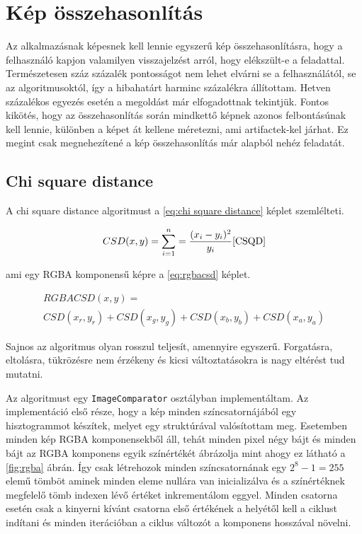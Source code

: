 \section{Kép összehasonlítás}

Az alkalmazásnak képesnek kell lennie egyszerű kép összehasonlításra, hogy a felhasználó kapjon valamilyen visszajelzést arról, hogy elékszült-e a feladattal. Természetesen száz százalék pontosságot nem lehet elvárni se a felhasználától, se az algoritmusoktól, így a hibahatárt harminc százalékra állítottam. Hetven százalékos egyezés esetén a megoldást már elfogadottnak tekintjük. Fontos kikötés, hogy az összehasonlítás során mindkettő képnek azonos felbontásúnak kell lennie, különben a képet át kellene méretezni, ami artifactek-kel járhat. Ez megint csak megnehezítené a kép összehasonlítás már alapból nehéz feladatát.

\subsection{Chi square distance}

A chi square distance algoritmust a \ref{eq:chi square distance} képlet szemlélteti.

\begin{equation} \label{eq:chi square distance}
    CSD(x,y) = \sum_{i=1}^{n} = \frac{(x_i - y_i)^2}{y_i}\cite{CSQD}
\end{equation}

ami egy RGBA komponensű képre a \ref{eq:rgbacsd} képlet.

\begin{equation} \label{eq:rgbacsd}
\begin{gathered}
RGBACSD(x,y) = \\
CSD(x_r, y_r) + CSD(x_g, y_g) + CSD(x_b, y_b) + CSD(x_a, y_a)
\end{gathered}
\end{equation}


Sajnos az algoritmus olyan rosszul teljesít, amennyire egyszerű. Forgatásra, eltolásra, tükrözésre nem érzékeny és kicsi változtatásokra is nagy eltérést tud mutatni.

Az algoritmust egy \texttt{ImageComparator} osztályban implementáltam. Az implementáció első része, hogy a kép minden színcsatornájából egy hisztogrammot készítek, melyet egy struktúrával valósítottam meg. Esetemben minden kép RGBA komponensekből áll, tehát minden pixel négy bájt és minden bájt az RGBA komponens egyik színértékét ábrázolja mint ahogy ez látható a \ref{fig:rgba} ábrán. Így csak létrehozok minden színcsatornának egy \(2^8 - 1 = 255\) elemű tömböt aminek minden eleme nullára van inicializálva és a színértéknek megfelelő tömb indexen lévő értéket inkrementálom eggyel. Minden csatorna esetén csak a kinyerni kívánt csatorna első értékének a helyétől kell a ciklust indítani és minden iterációban a ciklus változót a komponens hosszával növelni.


